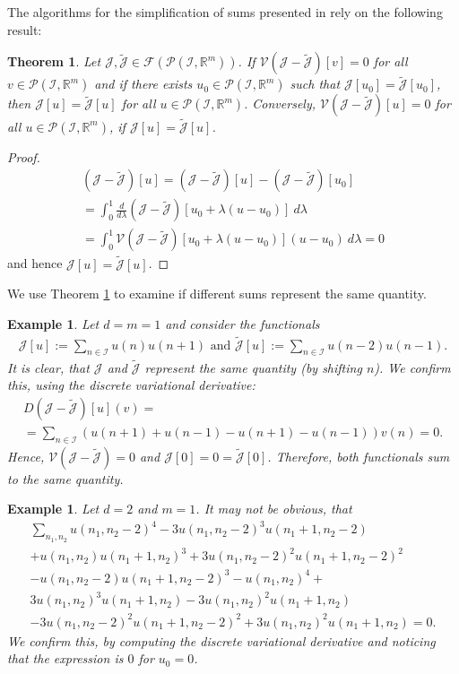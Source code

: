 \documentclass[manuscript]{acmart}
\newcommand{\Rr}{{\mathbb{R}}}
\newcommand{\1}{{\chi}}
\newcommand{\Ii}{{\mathcal{I}}}
\numberwithin{equation}{section}
\theoremstyle{thmlemcorr}
\numberwithin{theorem}{section}
\theoremstyle{thmlemcorr*}
\theoremstyle{defi}
\theoremstyle{remexample}
\newtheorem{example}[theorem]{Example}
\newtheorem{teo}[theorem]{Theorem}
\theoremstyle{ass}
\begin{document}
The algorithms for the simplification of sums presented in \cite{gomes20} rely on the following result:
\begin{teo}\label{theo1}
	Let $\mathcal{J},\tilde{\mathcal{J}}\in \mathcal{F}(\mathcal{P}(\Ii,\Rr^m))$. If $\mathcal{V}(\mathcal{J}-\tilde{\mathcal{J}})[v]=0$ for all $v\in\mathcal{P}(\Ii,\Rr^m)$ and if there exists $u_0\in\mathcal{P}(\Ii,\Rr^m)$ such that $\mathcal{J}[u_0]=\tilde{\mathcal{J}}[u_0]$, then
		$\mathcal{J}[u]=\tilde{\mathcal{J}}[u]$
	for all $u\in\mathcal{P}(\Ii,\Rr^m)$.
	Conversely,
		 $\mathcal{V}(\mathcal{J}-\tilde{\mathcal{J}})[u]=0$
	for all $u\in\mathcal{P}(\Ii,\Rr^m)$, if $\mathcal{J}[u]=\tilde{\mathcal{J}}[u]$.
\end{teo}
\begin{proof}
	\begin{gather*}
		(\mathcal{J}-\tilde{\mathcal{J}})[u]=(\mathcal{J}-\tilde{\mathcal{J}})[u]-(\mathcal{J}-\tilde{\mathcal{J}})[u_0]\\
		=\int_{0}^{1}\frac{d}{d\lambda}(\mathcal{J}-\tilde{\mathcal{J}})[u_0+\lambda(u-u_0)]\ d\lambda\\
		=\int_{0}^{1}\mathcal{V}(\mathcal{J}-\tilde{\mathcal{J}})[u_0+\lambda(u-u_0)](u-u_0)\ d\lambda=0
	\end{gather*}
	and hence $\mathcal{J}[u]=\tilde{\mathcal{J}}[u]$.
\end{proof}
We use Theorem \ref{theo1} to examine if different sums represent the same quantity.
\begin{example}
	Let $d=m=1$ and consider the functionals
	\begin{gather*}
		\mathcal{J}[u]:=\sum_{n\in\Ii}u(n)u(n+1)\text{ and }
		\tilde{\mathcal{J}}[u]:=\sum_{n\in\Ii}u(n-2)u(n-1).
	\end{gather*}
	It is clear, that $\mathcal{J}$ and $\tilde{\mathcal{J}}$ represent the same quantity (by shifting $n$). We confirm this, using the discrete variational derivative:
	\begin{gather*}
		D(\mathcal{J}-\tilde{\mathcal{J}})[u](v)=\\
		=\sum_{n\in\Ii}(u(n+1)+u(n-1)-u(n+1)-u(n-1))v(n)=0.
	\end{gather*}
	Hence, $\mathcal{V}(\mathcal{J}-\tilde{\mathcal{J}})=0$ and $\mathcal{J}[0]=0=\tilde{\mathcal{J}}[0]$. Therefore, both functionals sum to the same quantity.
\end{example}

\begin{example}
	Let $d=2$ and $m=1$. It may not be obvious, that
	\begin{gather*}
		\sum_{n_1,n_2}u(n_1,n_2-2)^4 - 3 u(n_1,n_2-2)^3 u(n_1+1,n_2-2) \\+ 
		u(n_1,n_2) u(n_1+1,n_2)^3 + 3 u(n_1,n_2-2)^2 u(n_1+1,n_2-2)^2\\ -
		u(n_1,n_2-2) u(n_1+1,n_2-2)^3
		- u(n_1, n_2)^4 +\\
		3 u(n_1,n_2)^3 u(n_1+1,n_2)- 3 u(n_1,n_2)^2 u(n_1+1,n_2)\\
		-3 u(n_1,n_2-2)^2 u(n_1+1,n_2-2)^2+ 3 u(n_1,n_2)^2 u(n_1+1,n_2)=0.
	\end{gather*}
	We confirm this, by computing the discrete variational derivative and noticing that the expression is $0$ for $u_0=0$.
\end{example}
\end{document}
